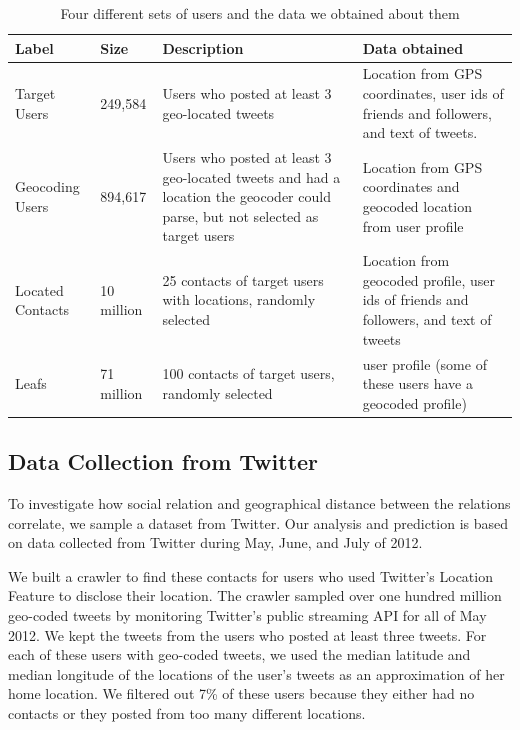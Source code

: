 \documentclass[letterpaper]{article}
\begin{document}
\begin{table}[tbh]
\scriptsize
\centering
\begin{tabular}{l l p{4cm} p{6cm}}
    Label & Size & Description & Data obtained \\
    \hline
    Target Users & 249,584 & Users who posted at least 3 geo-located tweets &
    Location from GPS coordinates, user ids of friends and followers,
    and text of tweets. \\
    Geocoding Users & 894,617 & Users who posted at least 3 geo-located tweets
    and had a location the geocoder could parse, but not selected as target users &
    Location from GPS coordinates and geocoded location from user profile \\
    Located Contacts & 10 million & 25 contacts of target users with locations, randomly selected &
    Location from geocoded profile, user ids of friends and followers, and text of tweets \\
    Leafs & 71 million & 100 contacts of target users, randomly selected &
    user profile (some of these users have a geocoded profile)\\
\end{tabular}
\caption{Four different sets of users and the data we obtained about them}
\label{tab:datasets}
\end{table}

\subsection{Data Collection from Twitter}
To investigate how social relation and geographical distance between the
relations correlate, we sample a dataset from Twitter.
%
Our analysis and prediction is based on data collected from Twitter during
May, June, and July of 2012.

We built a crawler to find these contacts for users who used Twitter's Location
Feature to disclose their location.
%
The crawler sampled over one hundred million geo-coded tweets by monitoring
Twitter's public streaming API for all of May 2012.
We kept the tweets from the users who posted at least three tweets.
%
For each of these users with geo-coded tweets, we used the median latitude and
median longitude of the locations of the user's tweets as an approximation of
her home location.
%
We filtered out 7\% of these users because they either had no contacts or they
posted from too many different locations.
\end{document}
